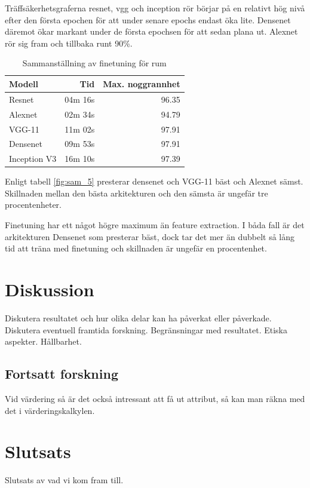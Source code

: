 \documentclass[]{kththesis}
\begin{document}
Träffsäkerhetsgraferna resnet, vgg och inception rör börjar på en relativt hög nivå efter den första epochen för att under senare epochs endast öka lite.
Densenet däremot ökar markant under de första epochsen för att sedan plana ut. 
Alexnet rör sig fram och tillbaka runt 90\%. 

\begin{table}[!htbp]
  \centering
  \begin{tabular}{|l|r|r|}
    Modell & Tid & Max. noggrannhet \\ 
    \hline
    Resnet       & 04m 16s & 96.35 \\
    Alexnet      & 02m 34s & 94.79 \\
    VGG-11       & 11m 02s & 97.91 \\
    Densenet     & 09m 53s & 97.91 \\
    Inception V3 & 16m 10s & 97.39 \\
  \end{tabular}
  \caption{Sammanställning av finetuning för rum}
  \label{fig:sam_6}    
\end{table}

Enligt tabell \ref{fig:sam_5} presterar densenet och VGG-11 bäst och Alexnet sämst.
Skillnaden mellan den bästa arkitekturen och den sämsta är ungefär tre procentenheter.

Finetuning har ett något högre maximum än feature extraction.
I båda fall är det arkitekturen Densenet som presterar bäst, dock tar det mer än dubbelt så lång tid att träna med finetuning och skillnaden är ungefär en procentenhet.


\chapter{Diskussion}
Diskutera resultatet och hur olika delar kan ha påverkat eller påverkade. Diskutera eventuell framtida forskning. Begränsningar med resultatet. Etiska aspekter. Hållbarhet.

\section{Fortsatt forskning}
Vid värdering så är det också intressant att få ut attribut, så kan man räkna med det i värderingskalkylen.

\chapter{Slutsats}  
Slutsats av vad vi kom fram till.
\end{document}
